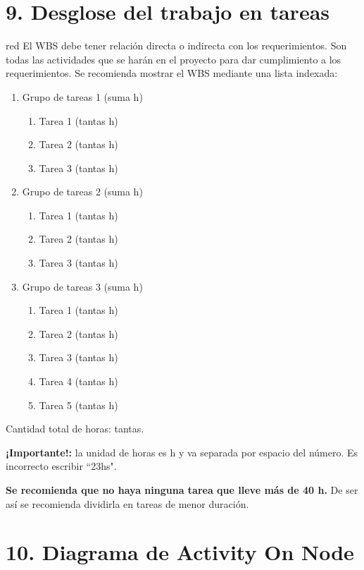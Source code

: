 \documentclass[12pt]
{charter}
\begin{document}
\section{9. Desglose del trabajo en tareas}
\label{sec:wbs}

\begin{consigna}{red}
El WBS debe tener relación directa o indirecta con los requerimientos.  Son todas las actividades que se harán en el proyecto para dar cumplimiento a los requerimientos. Se recomienda mostrar el WBS mediante una lista indexada:

\begin{enumerate}
\item Grupo de tareas 1 (suma h)
	\begin{enumerate}
	\item Tarea 1 (tantas h)
	\item Tarea 2 (tantas h)
	\item Tarea 3 (tantas h)
	\end{enumerate}
\item Grupo de tareas 2 (suma h)
	\begin{enumerate}
	\item Tarea 1 (tantas h)
	\item Tarea 2 (tantas h)
	\item Tarea 3 (tantas h)
	\end{enumerate}
\item Grupo de tareas 3 (suma h)
	\begin{enumerate}
	\item Tarea 1 (tantas h)
	\item Tarea 2 (tantas h)
	\item Tarea 3 (tantas h)
	\item Tarea 4 (tantas h)
	\item Tarea 5 (tantas h)
	\end{enumerate}
\end{enumerate}

Cantidad total de horas: tantas.

\textbf{¡Importante!:} la unidad de horas es h y va separada por espacio del número. Es incorrecto escribir ``23hs".

\textbf{Se recomienda que no haya ninguna tarea que lleve más de 40 h.} De ser así se recomienda dividirla en tareas de menor duración.

\end{consigna}

\section{10. Diagrama de Activity On Node}
\label{sec:AoN}
\end{document}
